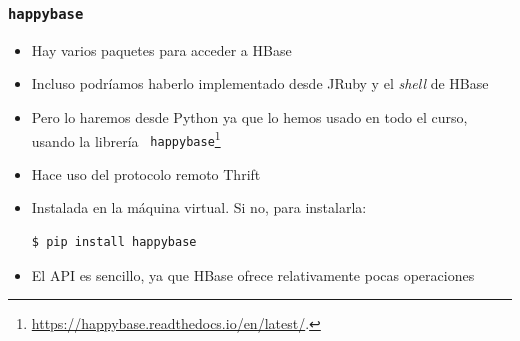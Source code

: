 \documentclass[14pt]{beamer}
\begin{document}
\begin{frame}[fragile]
  \frametitle{{\tt happybase}}
  \begin{itemize}
\item Hay varios paquetes para acceder a HBase
\item Incluso podríamos haberlo implementado desde JRuby y el {\em shell\/}
  de HBase
\item Pero lo haremos desde Python ya que lo hemos usado en todo el curso,
  usando la librería {\tt
    happybase}\footnote{\url{https://happybase.readthedocs.io/en/latest/}.}
\item Hace uso del protocolo remoto Thrift
\item Instalada en la máquina virtual. Si no, para instalarla:
\begin{lstlisting}[language=bash]
$ pip install happybase
\end{lstlisting}
\item El API es sencillo, ya que HBase ofrece relativamente pocas
  operaciones
\end{itemize}
\end{frame}
\end{document}
